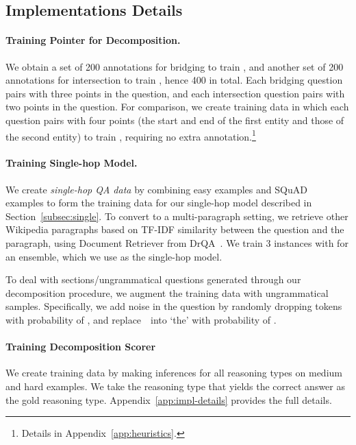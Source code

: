 \subsection{Implementations Details}\label{subsec:train-details}
\paragraph{Training {\textbf{Pointer}} for Decomposition.}
We obtain a set of 200 annotations for bridging to train , and another set of 200 annotations for intersection to train , hence 400 in total.
Each bridging question pairs with three points in the question, and each intersection question pairs with two points in the question.
For comparison, we create training data in which each question pairs with four points (the start and end of the first entity and those of the second entity) to train , requiring no extra annotation.\footnote{Details in Appendix~\ref{app:heuristics}.}

\paragraph{Training Single-hop \RC{} Model.} We create {\em single-hop QA data} by combining \hotpot{} easy examples and SQuAD~\citep{squad} examples to form the training data for our single-hop \RC{} model described in Section~\ref{subsec:single}.
To convert \squad{} to a multi-paragraph setting, we retrieve  other Wikipedia paragraphs based on TF-IDF similarity between the question and the paragraph, using Document Retriever from DrQA~\citep{squad-open}.
We train 3 instances with  for an ensemble, which we use as the single-hop model.

To deal with sections/ungrammatical questions generated through our decomposition procedure, we augment the training data with ungrammatical samples.
Specifically, we add noise in the question by randomly dropping tokens with probability of , and  replace~\whword~into `the' with probability of .

\paragraph{Training Decomposition Scorer}
We create training data by making inferences for all reasoning types on \hotpot{} medium and hard examples.
We take the reasoning type that yields the correct answer as the gold reasoning type.
Appendix~\ref{app:impl-details} provides the full details.

